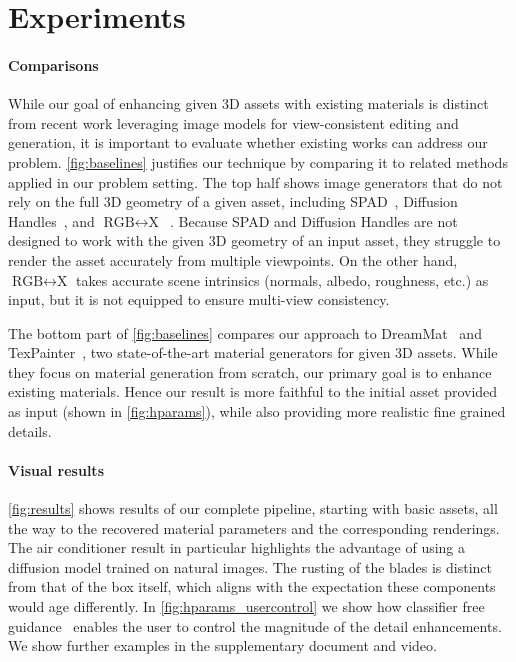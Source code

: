 \section{Experiments}
\label{sec:results}



\paragraph{Comparisons}
While our goal of enhancing given 3D assets with existing materials is distinct from recent work leveraging image models for view-consistent editing and generation, it is important to evaluate whether existing works can address our problem. \autoref{fig:baselines} justifies our technique by comparing it to related methods applied in our problem setting. The top half shows image generators that do not rely on the full 3D geometry of a given asset, including SPAD~\cite{spad}, Diffusion Handles~\cite{diffusion_handles}, and $\text{RGB}{\leftrightarrow}\text{X}$~\cite{RGBX}. Because SPAD and Diffusion Handles are not designed to work with the given 3D geometry of an input asset, they struggle to render the asset accurately from multiple viewpoints. On the other hand, $\text{RGB}{\leftrightarrow}\text{X}$ takes accurate scene intrinsics (normals, albedo, roughness, etc.) as input, but it is not equipped to ensure multi-view consistency.

The bottom part of \autoref{fig:baselines} compares our approach to DreamMat~\cite{dreammat} and TexPainter~\cite{TexPainter}, two state-of-the-art material generators for given 3D assets. While they focus on material generation from scratch, our primary goal is to enhance existing materials. Hence our result is more faithful to the initial asset provided as input (shown in \autoref{fig:hparams}), while also providing more realistic fine grained details. 





\paragraph{Visual results}
\autoref{fig:results} shows results of our complete pipeline, starting with basic assets, all the way to the recovered material parameters and the corresponding renderings.
The air conditioner result in particular highlights the advantage of using a diffusion model trained on natural images.
The rusting of the blades is distinct from that of the box itself, which aligns with the expectation these components would age differently.
In \autoref{fig:hparams_usercontrol} we show how classifier free guidance~\cite{ho2022cfg} enables the user to control the magnitude of the detail enhancements.
We show further examples in the supplementary document and video.

